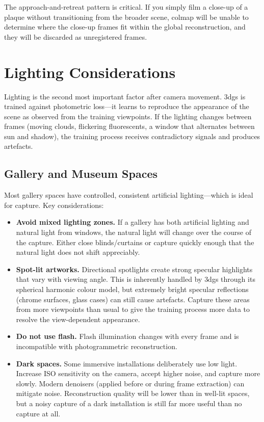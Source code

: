 \begin{technote}
The approach-and-retreat pattern is critical. If you simply film a close-up of a plaque without transitioning from the broader scene, \acrshort{colmap} will be unable to determine where the close-up frames fit within the global reconstruction, and they will be discarded as unregistered frames.
\end{technote}

\section{Lighting Considerations}
\label{sec:cap-lighting}

Lighting is the second most important factor after camera movement. \acrshort{3dgs} is trained against photometric loss---it learns to reproduce the appearance of the scene as observed from the training viewpoints. If the lighting changes between frames (moving clouds, flickering fluorescents, a window that alternates between sun and shadow), the training process receives contradictory signals and produces artefacts.

\subsection{Gallery and Museum Spaces}

Most gallery spaces have controlled, consistent artificial lighting---which is ideal for capture. Key considerations:

\begin{itemize}
  \item \textbf{Avoid mixed lighting zones.} If a gallery has both artificial lighting and natural light from windows, the natural light will change over the course of the capture. Either close blinds/curtains or capture quickly enough that the natural light does not shift appreciably.
  \item \textbf{Spot-lit artworks.} Directional spotlights create strong specular highlights that vary with viewing angle. This is inherently handled by \acrshort{3dgs} through its spherical harmonic colour model, but extremely bright specular reflections (chrome surfaces, glass cases) can still cause artefacts. Capture these areas from more viewpoints than usual to give the training process more data to resolve the view-dependent appearance.
  \item \textbf{Do not use flash.} Flash illumination changes with every frame and is incompatible with photogrammetric reconstruction.
  \item \textbf{Dark spaces.} Some immersive installations deliberately use low light. Increase ISO sensitivity on the camera, accept higher noise, and capture more slowly. Modern denoisers (applied before or during frame extraction) can mitigate noise. Reconstruction quality will be lower than in well-lit spaces, but a noisy capture of a dark installation is still far more useful than no capture at all.
\end{itemize}

